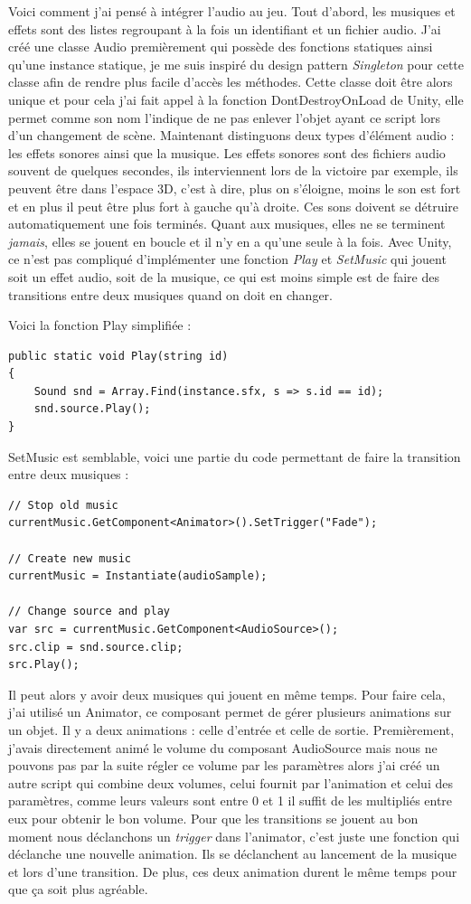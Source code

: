 \documentclass{article}
\begin{document}
Voici comment j'ai pensé à intégrer l'audio au jeu.
Tout d'abord, les musiques et effets sont des listes regroupant à la fois un identifiant et un fichier audio.
J'ai créé une classe Audio premièrement qui possède des fonctions statiques ainsi qu'une instance statique, je me suis inspiré du design pattern \emph{Singleton} pour cette classe afin de rendre plus facile d'accès les méthodes. Cette classe doit être alors unique et pour cela j'ai fait appel à la fonction DontDestroyOnLoad de Unity, elle permet comme son nom l'indique de ne pas enlever l'objet ayant ce script lors d'un changement de scène. Maintenant distinguons deux types d'élément audio : les effets sonores ainsi que la musique. Les effets sonores sont des fichiers audio souvent de quelques secondes, ils interviennent lors de la victoire par exemple, ils peuvent être dans l'espace 3D, c'est à dire, plus on s'éloigne, moins le son est fort et en plus il peut être plus fort à gauche qu'à droite. Ces sons doivent se détruire automatiquement une fois terminés. Quant aux musiques, elles ne se terminent \emph{jamais}, elles se jouent en boucle et il n'y en a qu'une seule à la fois. Avec Unity, ce n'est pas compliqué d'implémenter une fonction \emph{Play} et \emph{SetMusic} qui jouent soit un effet audio, soit de la musique, ce qui est moins simple est de faire des transitions entre deux musiques quand on doit en changer.

Voici la fonction Play simplifiée :
\begin{lstlisting}
public static void Play(string id)
{
    Sound snd = Array.Find(instance.sfx, s => s.id == id);
    snd.source.Play();
}
\end{lstlisting}

SetMusic est semblable, voici une partie du code permettant de faire la transition entre deux musiques :
\begin{lstlisting}
// Stop old music
currentMusic.GetComponent<Animator>().SetTrigger("Fade");

// Create new music
currentMusic = Instantiate(audioSample);

// Change source and play
var src = currentMusic.GetComponent<AudioSource>();
src.clip = snd.source.clip;
src.Play();
\end{lstlisting}

Il peut alors y avoir deux musiques qui jouent en même temps. Pour faire cela, j'ai utilisé un Animator, ce composant permet de gérer plusieurs animations sur un objet. Il y a deux animations : celle d'entrée et celle de sortie. Premièrement, j'avais directement animé le volume du composant AudioSource mais nous ne pouvons pas par la suite régler ce volume par les paramètres alors j'ai créé un autre script qui combine deux volumes, celui fournit par l'animation et celui des paramètres, comme leurs valeurs sont entre 0 et 1 il suffit de les multipliés entre eux pour obtenir le bon volume. Pour que les transitions se jouent au bon moment nous déclanchons un \emph{trigger} dans l'animator, c'est juste une fonction qui déclanche une nouvelle animation. Ils se déclanchent au lancement de la musique et lors d'une transition. De plus, ces deux animation durent le même temps pour que ça soit plus agréable.
\end{document}
